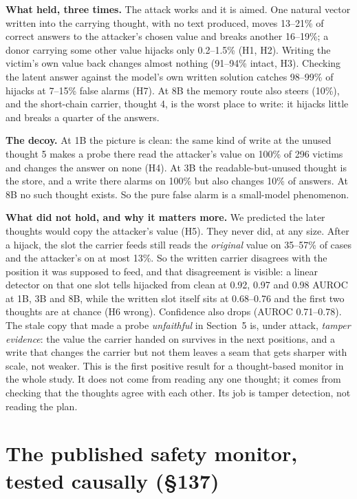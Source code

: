 \documentclass{article}
\begin{document}
\begin{plain}
\textbf{What held, three times.} The attack works and it is aimed. One natural vector written into the carrying thought, with no text produced, moves 13--21\% of correct answers to the attacker's chosen value and breaks another 16--19\%; a donor carrying some other value hijacks only 0.2--1.5\% (H1, H2). Writing the victim's own value back changes almost nothing (91--94\% intact, H3). Checking the latent answer against the model's own written solution catches 98--99\% of hijacks at 7--15\% false alarms (H7). At 8B the memory route also steers (10\%), and the short-chain carrier, thought 4, is the worst place to write: it hijacks little and breaks a quarter of the answers.

\textbf{The decoy.} At 1B the picture is clean: the same kind of write at the unused thought 5 makes a probe there read the attacker's value on 100\% of 296 victims and changes the answer on none (H4). At 3B the readable-but-unused thought is the store, and a write there alarms on 100\% but also changes 10\% of answers. At 8B no such thought exists. So the pure false alarm is a small-model phenomenon.

\textbf{What did not hold, and why it matters more.} We predicted the later thoughts would copy the attacker's value (H5). They never did, at any size. After a hijack, the slot the carrier feeds still reads the \emph{original} value on 35--57\% of cases and the attacker's on at most 13\%. So the written carrier disagrees with the position it was supposed to feed, and that disagreement is visible: a linear detector on that one slot tells hijacked from clean at 0.92, 0.97 and 0.98 AUROC at 1B, 3B and 8B, while the written slot itself sits at 0.68--0.76 and the first two thoughts are at chance (H6 wrong). Confidence also drops (AUROC 0.71--0.78). The stale copy that made a probe \emph{unfaithful} in Section~5 is, under attack, \emph{tamper evidence}: the value the carrier handed on survives in the next positions, and a write that changes the carrier but not them leaves a seam that gets sharper with scale, not weaker. This is the first positive result for a thought-based monitor in the whole study. It does not come from reading any one thought; it comes from checking that the thoughts agree with each other. Its job is tamper detection, not reading the plan.
\end{plain}

\section{The published safety monitor, tested causally (\S137)}
\end{document}
